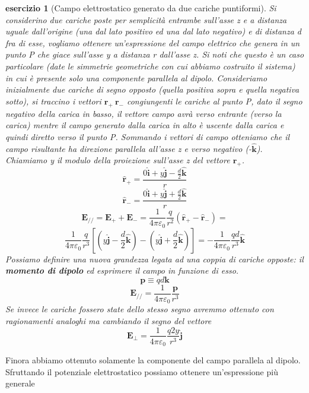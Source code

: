 \documentclass[10pt,a4paper]{article}
\newtheorem{esercizio}{esercizio}
\begin{document}
\begin{esercizio}[Campo elettrostatico generato da due cariche puntiformi]
	Si considerino due cariche poste per semplicità entrambe sull'asse z e a distanza uguale dall'origine (una dal lato positivo ed una dal lato negativo) e di distanza d fra di esse, vogliamo ottenere un'espressione del campo elettrico che genera in un punto P che giace sull'asse y a distanza r dall'asse z. Si noti che questo è un caso particolare (date le simmetrie geometriche con cui abbiamo costruito il sistema) in cui è presente solo una componente parallela al dipolo. Consideriamo inizialmente due cariche di segno opposto (quella positiva sopra e quella negativa sotto), si traccino i vettori \(\mathbf{r}_+ \ \mathbf{r}_- \) congiungenti le cariche al punto P, dato il segno negativo della carica in basso, il vettore campo avrà verso entrante (verso la carica) mentre il campo generato dalla carica in alto è uscente dalla carica e quindi diretto verso il punto P. Sommando i vettori di campo otteniamo che il campo risultante ha direzione parallela all'asse z e verso negativo (-$\hat{\mathbf{k}}$). Chiamiamo y il modulo della proiezione sull'asse z del vettore $\mathbf{r}_+$.
	\[\hat{\mathbf{r}}_+ =\frac{ 0\hat{\mathbf{i}}+y \hat{\mathbf{j}}-\frac{d}{2}\hat{\mathbf{k}}}{r}\]
	\[\hat{\mathbf{r}}_- = \frac{0\hat{\mathbf{i}}+y \hat{\mathbf{j}}+\frac{d}{2}\hat{\mathbf{k}}}{r}\]
	\[\mathbf{E}_{//} = \mathbf{E}_{+} + \mathbf{E}_{-} = \frac{1}{4\pi\varepsilon_0}\frac{q}{r^2}\left(\hat{\mathbf{r}}_+-\hat{\mathbf{r}}_-\right)=\]
	\[\frac{1}{4\pi\varepsilon_0}\frac{q}{r^3}\left[(y\hat{\mathbf{j}}-\frac{d}{2}\hat{\mathbf{k}})-(y\hat{\mathbf{j}}+\frac{d}{2}\hat{\mathbf{k}})\right]= -\frac{1}{4\pi\varepsilon_0}\frac{q d}{r^3}\hat{\mathbf{k}}\]
	Possiamo definire una nuova grandezza legata ad una coppia di cariche opposte: il \textbf{momento di dipolo} ed esprimere il campo in funzione di esso.
	\[\mathbf{p} \equiv qd\mathbf{k}\]
	\[\mathbf{E}_{//} = \frac{1}{4\pi\varepsilon_0}\frac{\mathbf{p}}{r^3}\]
	Se invece le cariche fossero state dello stesso segno avremmo ottenuto con ragionamenti analoghi ma cambiando il segno del vettore
	\[\mathbf{E}_{\perp} = \frac{1}{4\pi\varepsilon_0}\frac{q2y}{r^3}\hat{\mathbf{j}}\]
\end{esercizio}
Finora abbiamo ottenuto solamente la componente del campo parallela al dipolo. Sfruttando il potenziale elettrostatico possiamo ottenere un'espressione più generale
\end{document}
